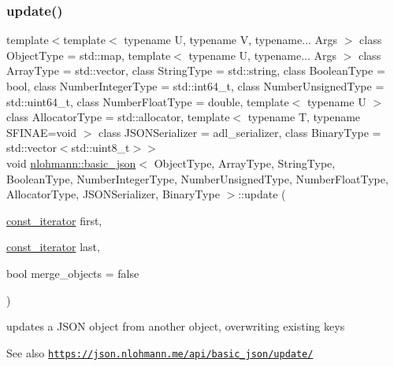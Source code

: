 \subsubsection{\texorpdfstring{update()}{update()}\hspace{0.1cm}{\footnotesize\ttfamily [2/2]}}
{\footnotesize\ttfamily template$<$template$<$ typename U, typename V, typename... Args $>$ class Object\+Type = std\+::map, template$<$ typename U, typename... Args $>$ class Array\+Type = std\+::vector, class String\+Type  = std\+::string, class Boolean\+Type  = bool, class Number\+Integer\+Type  = std\+::int64\+\_\+t, class Number\+Unsigned\+Type  = std\+::uint64\+\_\+t, class Number\+Float\+Type  = double, template$<$ typename U $>$ class Allocator\+Type = std\+::allocator, template$<$ typename T, typename S\+F\+I\+N\+A\+E=void $>$ class J\+S\+O\+N\+Serializer = adl\+\_\+serializer, class Binary\+Type  = std\+::vector$<$std\+::uint8\+\_\+t$>$$>$ \\
void \hyperlink{classnlohmann_1_1basic__json}{nlohmann\+::basic\+\_\+json}$<$ Object\+Type, Array\+Type, String\+Type, Boolean\+Type, Number\+Integer\+Type, Number\+Unsigned\+Type, Number\+Float\+Type, Allocator\+Type, J\+S\+O\+N\+Serializer, Binary\+Type $>$\+::update (\begin{DoxyParamCaption}\item[{\hyperlink{classnlohmann_1_1basic__json_aebd2cfa7e4ded4e97cde9269bfeeea38}{const\+\_\+iterator}}]{first,  }\item[{\hyperlink{classnlohmann_1_1basic__json_aebd2cfa7e4ded4e97cde9269bfeeea38}{const\+\_\+iterator}}]{last,  }\item[{bool}]{merge\+\_\+objects = {\ttfamily false} }\end{DoxyParamCaption})\hspace{0.3cm}{\ttfamily [inline]}}



updates a J\+S\+ON object from another object, overwriting existing keys 

\begin{DoxySeeAlso}{See also}
\href{https://json.nlohmann.me/api/basic_json/update/}{\tt https\+://json.\+nlohmann.\+me/api/basic\+\_\+json/update/} 
\end{DoxySeeAlso}
\mbox{\label{classnlohmann_1_1basic__json_a11641b35219676b225d9bd15c7677659}} 
